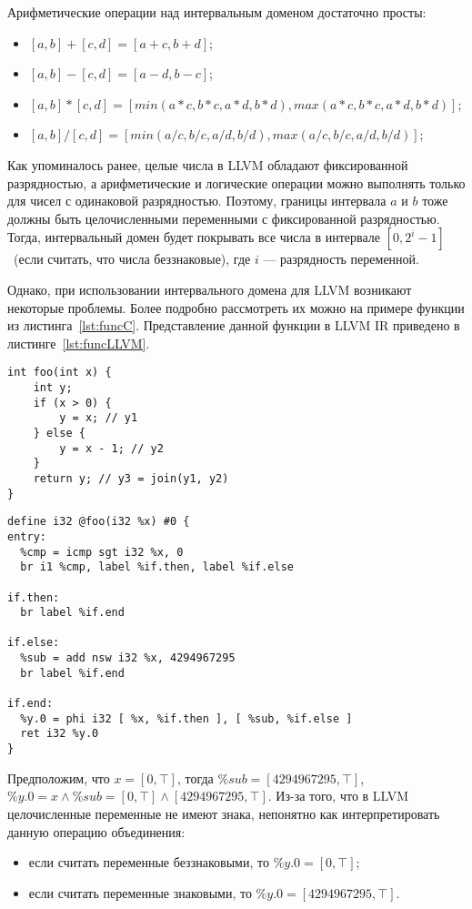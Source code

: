 Арифметические операции над интервальным доменом достаточно просты:
\begin{itemize}
\item $[a, b] + [c, d] = [a + c, b + d]$;
\item $[a, b] - [c, d] = [a - d, b - c]$;
\item $[a, b] * [c, d] = [min(a * c, b * c, a * d, b * d), max(a * c, b * c,
a * d, b * d)]$;
\item $[a, b] / [c, d] = [min(a / c, b / c, a / d, b / d), max(a / c, b / c,
a / d, b / d)]$;
\end{itemize}

Как упоминалось ранее, целые числа в LLVM обладают фиксированной разрядностью, 
а арифметические и логические операции можно выполнять только для чисел с 
одинаковой разрядностью. Поэтому, границы интервала $a$ и $b$ тоже должны быть
целочисленными переменными с фиксированной разрядностью. Тогда, интервальный 
домен будет покрывать все числа в интервале $[0, 2^i - 1]$~(если считать, что
числа беззнаковые), где $i$ --- разрядность переменной. 

Однако, при использовании интервального домена для LLVM возникают некоторые 
проблемы. Более подробно рассмотреть их можно на примере функции из 
листинга~\ref{lst:funcC}. Представление данной функции в LLVM IR приведено в
листинге~\ref{lst:funcLLVM}.

\begin{lstlisting}[style=c, caption={Пример функции на языке С}, 
label=lst:funcC]
int foo(int x) {
    int y;
    if (x > 0) {
        y = x; // y1
    } else {
        y = x - 1; // y2
    }
    return y; // y3 = join(y1, y2)
}
\end{lstlisting}

\begin{lstlisting}[style=llvm, caption={Представление функции из 
    листинга~\ref{lst:funcC} в LLVM IR}, label=lst:funcLLVM]
define i32 @foo(i32 %x) #0 {
entry:
  %cmp = icmp sgt i32 %x, 0
  br i1 %cmp, label %if.then, label %if.else

if.then:
  br label %if.end

if.else:
  %sub = add nsw i32 %x, 4294967295
  br label %if.end

if.end:
  %y.0 = phi i32 [ %x, %if.then ], [ %sub, %if.else ]
  ret i32 %y.0
}
\end{lstlisting}


Предположим, что $x = [0, \top]$, тогда $\%sub = [4294967295, \top]$, $\%y.0 = 
x \wedge \%sub = [0, \top] \wedge [4294967295, \top]$. Из-за того, что в LLVM целочисленные переменные не имеют знака, непонятно как интерпретировать данную
операцию объединения:
\begin{itemize}
\item если считать переменные беззнаковыми, то $\%y.0 = [0, \top]$;
\item если считать переменные знаковыми, то $\%y.0 = [4294967295, \top]$.
\end{itemize}

